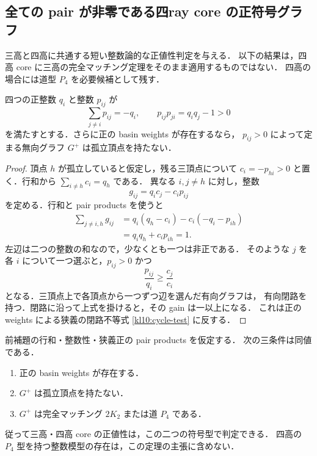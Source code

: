 \subsection{全ての pair が非零である四ray core の正符号グラフ}
\label{fg24:section}

三高と四高に共通する短い整数論的な正値性判定を与える．
以下の結果は，四高 core に三高の完全マッチング定理をそのまま適用するものではない．
四高の場合には道型 $P_4$ を必要候補として残す．

\begin{lemma}[正符号の孤立頂点は存在しない]
\label{fg24:no-isolated}
四つの正整数 $q_i$ と整数 $p_{ij}$ が
\[
 \sum_{j\ne i}p_{ij}=-q_i,\qquad
 p_{ij}p_{ji}=q_iq_j-1>0
\]
を満たすとする．さらに正の basin weights が存在するなら，
$p_{ij}>0$ によって定まる無向グラフ $G^+$ は孤立頂点を持たない．
\end{lemma}

\begin{proof}
頂点 $h$ が孤立していると仮定し，残る三頂点について
$c_i=-p_{hi}>0$ と置く．行和から $\sum_{i\ne h}c_i=q_h$ である．
異なる $i,j\ne h$ に対し，整数
\[
 g_{ij}=q_i c_j-c_i p_{ij}
\]
を定める．行和と pair products を使うと
\begin{align*}
 \sum_{j\ne i,h}g_{ij}
 &=q_i(q_h-c_i)-c_i(-q_i-p_{ih})\\
 &=q_iq_h+c_i p_{ih}=1.
\end{align*}
左辺は二つの整数の和なので，少なくとも一つは非正である．
そのような $j$ を各 $i$ について一つ選ぶと，$p_{ij}>0$ かつ
\[
 \frac{p_{ij}}{q_i}\ge\frac{c_j}{c_i}
\]
となる．三頂点上で各頂点から一つずつ辺を選んだ有向グラフは，
有向閉路を持つ．閉路に沿って上式を掛けると，その gain は一以上になる．
これは正の weights による狭義の閉路不等式
\eqref{kl10:cycle-test} に反する．
\end{proof}

\begin{theorem}
\label{fg24:criterion}
前補題の行和・整数性・狭義正の pair products を仮定する．
次の三条件は同値である．
\begin{enumerate}
 \item 正の basin weights が存在する．
 \item $G^+$ は孤立頂点を持たない．
 \item $G^+$ は完全マッチング $2K_2$ または道 $P_4$ である．
\end{enumerate}
従って三高・四高 core の正値性は，この二つの符号型で判定できる．
四高の $P_4$ 型を持つ整数模型の存在は，この定理の主張に含めない．
\end{theorem}

